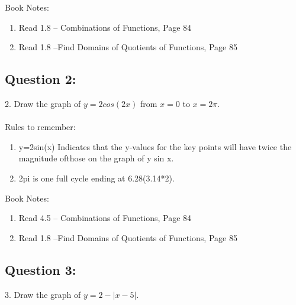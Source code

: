 \documentclass[12pt, letterpaper]{article}
\begin{document}
Book Notes:
\begin{enumerate}
  \item Read 1.8 -- Combinations of Functions, Page 84
    \item Read 1.8 --Find Domains of Quotients of Functions, Page 85  
\end{enumerate}

\subsection{Question 2:}
2. Draw the graph of $y=2cos(2x)$ from $x=0$ to $x=2\pi$. \\\\

Rules to remember:
\begin{enumerate}
\item y=2sin(x) Indicates that the y-values for the key points will have
  twice the magnitude ofthose on the graph of y  sin x.
  \item 2pi is one full cycle ending at 6.28(3.14*2).
\end{enumerate}


Book Notes:
\begin{enumerate}
  \item Read 4.5 -- Combinations of Functions, Page 84
    \item Read 1.8 --Find Domains of Quotients of Functions, Page 85  
\end{enumerate}


\subsection{Question 3:}
3. Draw the graph of $y=2-|x-5|$.
\\\\\\
\end{document}
